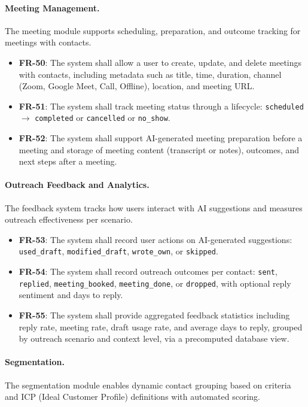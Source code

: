 \paragraph{Meeting Management.}
The meeting module supports scheduling, preparation, and outcome tracking for meetings with contacts.

\begin{itemize}
    \item \textbf{FR-50}: The system shall allow a user to create, update, and delete meetings with contacts, including metadata such as title, time, duration, channel (Zoom, Google Meet, Call, Offline), location, and meeting URL.
    \item \textbf{FR-51}: The system shall track meeting status through a lifecycle: \texttt{scheduled} $\rightarrow$ \texttt{completed} or \texttt{cancelled} or \texttt{no\_show}.
    \item \textbf{FR-52}: The system shall support AI-generated meeting preparation before a meeting and storage of meeting content (transcript or notes), outcomes, and next steps after a meeting.
\end{itemize}

\paragraph{Outreach Feedback and Analytics.}
The feedback system tracks how users interact with AI suggestions and measures outreach effectiveness per scenario.

\begin{itemize}
    \item \textbf{FR-53}: The system shall record user actions on AI-generated suggestions: \texttt{used\_draft}, \texttt{modified\_draft}, \texttt{wrote\_own}, or \texttt{skipped}.
    \item \textbf{FR-54}: The system shall record outreach outcomes per contact: \texttt{sent}, \texttt{replied}, \texttt{meeting\_booked}, \texttt{meeting\_done}, or \texttt{dropped}, with optional reply sentiment and days to reply.
    \item \textbf{FR-55}: The system shall provide aggregated feedback statistics including reply rate, meeting rate, draft usage rate, and average days to reply, grouped by outreach scenario and context level, via a precomputed database view.
\end{itemize}

\paragraph{Segmentation.}
The segmentation module enables dynamic contact grouping based on criteria and ICP (Ideal Customer Profile) definitions with automated scoring.

